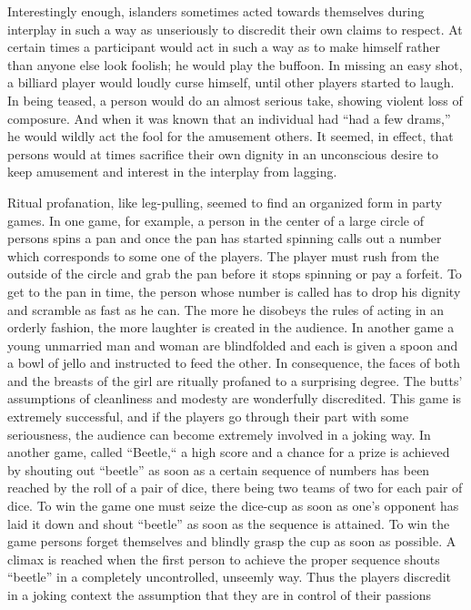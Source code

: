 \documentclass[twoside,symmetric,nobib,justified]{tufte-book}
\begin{document}
Interestingly enough, islanders sometimes acted towards themselves
during interplay in such a way as unseriously to discredit their own
claims to respect. At certain times a participant would act in such a
way as to make himself rather than anyone else look foolish; he would
play the buffoon. In missing an easy shot, a billiard player would
loudly curse himself, until other players started to laugh. In being
teased, a person would do an almost serious take, showing violent loss
of composure. And when it was known that an individual had ``had a few
drams,'' he would wildly act the fool for the amusement others. It
seemed, in effect, that persons would at times sacrifice their own
dignity in an unconscious desire to keep amusement and interest in the
interplay from lagging.

Ritual profanation, like leg-pulling, seemed to find an organized form
in party games. In one game, for example, a person in the center of a
large circle of persons spins a pan and once the pan has started
spinning calls out a number which corresponds to some one of the
players. The player must rush from the outside of the circle and grab
the pan before it stops spinning or pay a forfeit. To get to the pan in
time, the person whose number is called has to drop his dignity and
scramble as fast as he can. The more he disobeys the rules of acting in
an orderly fashion, the more laughter is created in the audience. In
another game a young unmarried man and woman are blindfolded and each is
given a spoon and a bowl of jello and instructed to feed the other. In
consequence, the faces of both and the breasts of the girl are ritually
profaned to a surprising degree. The butts' assumptions of cleanliness
and modesty are wonderfully discredited. This game is extremely
successful, and if the players go through their part with some
seriousness, the audience can become extremely involved in a joking way.
In another game, called ``Beetle,`` a high score and a chance for a
prize is achieved by shouting out ``beetle'' as soon as a certain
sequence of numbers has been reached by the roll of a pair of dice,
there being two teams of two for each pair of dice. To win the game one
must seize the dice-cup as soon as one's opponent has laid it down and
shout ``beetle'' as soon as the sequence is attained. To win the game
persons forget themselves and blindly grasp the cup as soon as possible.
A climax is reached when the first person to achieve the proper sequence
shouts ``beetle'' in a completely uncontrolled, unseemly way. Thus the
players discredit in a joking context the assumption that they are in
control of their passions
\end{document}
